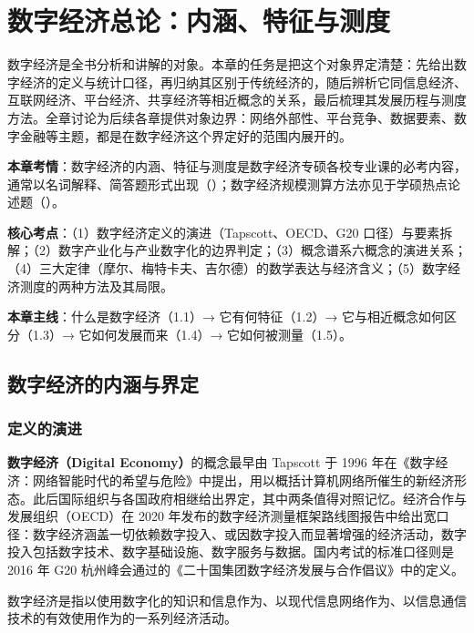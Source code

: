 \chapter{数字经济总论：内涵、特征与测度}

数字经济是全书分析和讲解的对象。本章的任务是把这个对象界定清楚：先给出数字经济的定义与统计口径，再归纳其区别于传统经济的，随后辨析它同信息经济、互联网经济、平台经济、共享经济等相近概念的关系，最后梳理其发展历程与测度方法。全章讨论为后续各章提供对象边界：网络外部性、平台竞争、数据要素、数字金融等主题，都是在数字经济这个界定好的范围内展开的。

\begin{examguide}
\textbf{本章考情}：数字经济的内涵、特征与测度是数字经济专硕各校专业课的必考内容，通常以名词解释、简答题形式出现（）；数字经济规模测算方法亦见于学硕热点论述题（）。

\textbf{核心考点}：（1）数字经济定义的演进（Tapscott、OECD、G20 口径）与要素拆解；（2）数字产业化与产业数字化的边界判定；（3）概念谱系六概念的演进关系；（4）三大定律（摩尔、梅特卡夫、吉尔德）的数学表达与经济含义；（5）数字经济测度的两种方法及其局限。

\textbf{本章主线}：什么是数字经济（1.1）→ 它有何特征（1.2）→ 它与相近概念如何区分（1.3）→ 它如何发展而来（1.4）→ 它如何被测量（1.5）。
\end{examguide}

\section{数字经济的内涵与界定}

\subsection{定义的演进}

\textbf{数字经济（Digital Economy）}的概念最早由 Tapscott 于 1996 年在《数字经济：网络智能时代的希望与危险》中提出，用以概括计算机网络所催生的新经济形态。此后国际组织与各国政府相继给出界定，其中两条值得对照记忆。经济合作与发展组织（OECD）在 2020 年发布的数字经济测量框架路线图报告中给出宽口径：数字经济涵盖一切依赖数字投入、或因数字投入而显著增强的经济活动，数字投入包括数字技术、数字基础设施、数字服务与数据。国内考试的标准口径则是 2016 年 G20 杭州峰会通过的《二十国集团数字经济发展与合作倡议》中的定义。

\begin{definition}
数字经济是指以使用数字化的知识和信息作为、以现代信息网络作为、以信息通信技术的有效使用作为的一系列经济活动。
\end{definition}


